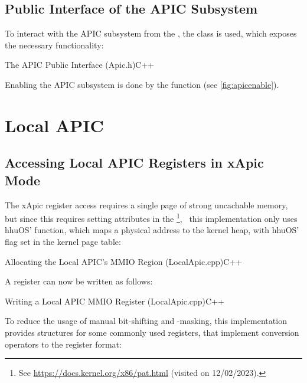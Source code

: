\subsection{Public Interface of the APIC Subsystem}
\label{subsec:hhuospublicinterface}

To interact with the APIC subsystem from the , the  class is used, which exposes the necessary functionality:

\begin{codeblock}{The APIC Public Interface (Apic.h)}{C++}
\end{codeblock}

Enabling the APIC subsystem is done by the  function (see \autoref{fig:apicenable}).

\clearpage

\section{Local APIC}
\label{sec:apxlocalapic}

\subsection{Accessing Local APIC Registers in xApic Mode}
\label{subsec:apxxapicregacc}

The xApic register access requires a single page of strong uncachable memory, but since this requires setting attributes in the \footnote{
  See \url{https://docs.kernel.org/x86/pat.html} (visited on 12/02/2023).},
\ this implementation only uses hhuOS'  function, which maps a physical address to the kernel heap, with hhuOS'  flag set in the kernel page table:

\begin{codeblock}{Allocating the Local APIC's MMIO Region (LocalApic.cpp)}{C++}
\end{codeblock}

A register can now be written as follows:

\begin{codeblock}[label=lst:lapicmmiowrite]{Writing a Local APIC MMIO Register (LocalApic.cpp)}{C++}
\end{codeblock}

To reduce the usage of manual bit-shifting and -masking, this implementation provides structures for some commonly used registers, that implement conversion operators to the register format:

